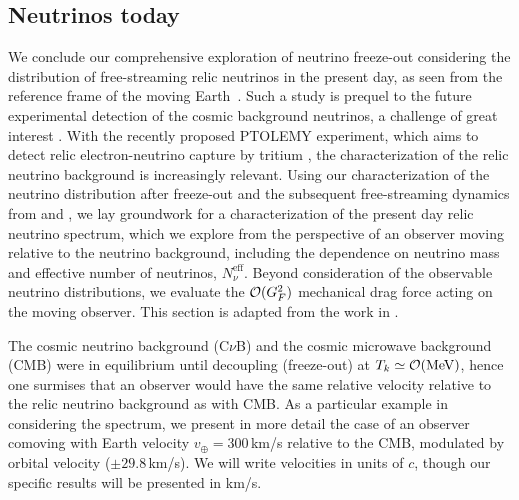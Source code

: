 \subsection{Neutrinos today}\label{ch:nu:today}
We conclude our comprehensive exploration of neutrino freeze-out considering the distribution of free-streaming relic neutrinos in the present day, as seen from the reference frame of the moving Earth~\cite{Birrell:2014qna}. Such a study is prequel to the future experimental detection of the cosmic background neutrinos,  a challenge of great interest \cite{Stodolsky:1974aq,Cabibbo:1982bb,Shvartsman,Langacker:1982ih,Smith:1983jj,Tupper:1987sf,Ferreras:1995wf,Hagmann:1999kf,Duda:2001hd,Gelmini:2004hg,Ringwald:2009bg,Liao:2012wb,Hedman:2013hha}. With the  recently proposed PTOLEMY experiment, which aims to detect relic  electron-neutrino capture by tritium \cite{Betts:2013uya,PTOLEMY:2019hkd}, the characterization of the relic neutrino background is increasingly relevant.  Using our  characterization of the neutrino distribution after freeze-out and the subsequent free-streaming dynamics from   and \cite{Birrell:2012gg}, we lay groundwork for a characterization of the present day relic neutrino spectrum, which we explore  from the  perspective of an observer moving relative to the neutrino background, including the dependence on neutrino mass and effective number of neutrinos, $N_\nu^{\mathrm{eff}}$. Beyond consideration of the observable neutrino distributions, we evaluate the ${\cal O}(G_F^2)$ mechanical drag force acting on the moving observer. This section is adapted from the work in \cite{Birrell:2014qna}.

The cosmic neutrino background (C$\nu$B) and the cosmic microwave background (CMB) were in equilibrium until decoupling (freeze-out) at $T_k\simeq {\cal O}{\rm (MeV)}$, hence one surmises that an observer would have the same relative velocity relative to the relic neutrino background  as with CMB. As a particular example in considering the spectrum, we present in more detail the case of an observer comoving with  Earth velocity $v_\oplus=300$\,km/s relative to the CMB,  modulated by orbital velocity ($\pm29.8$\,km/s).  We will write velocities in units of $c$, though our specific results will be presented in km/s.

